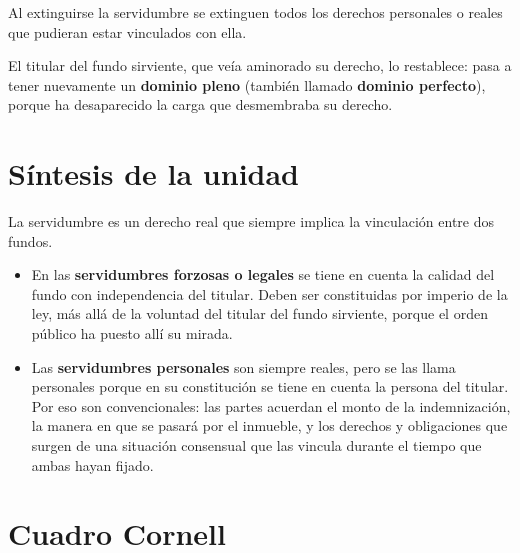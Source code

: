 \documentclass[12pt,oneside]{book}
\begin{document}
Al extinguirse la servidumbre se extinguen todos los derechos personales o reales que pudieran estar vinculados con ella.

El titular del fundo sirviente, que veía aminorado su derecho, lo restablece: pasa a tener nuevamente un \textbf{dominio pleno} (también llamado \textbf{dominio perfecto}), porque ha desaparecido la carga que desmembraba su derecho.

\section{Síntesis de la unidad}

La servidumbre es un derecho real que siempre implica la vinculación entre dos fundos.

\begin{itemize}
    \item En las \textbf{servidumbres forzosas o legales} se tiene en cuenta la calidad del fundo con independencia del titular. Deben ser constituidas por imperio de la ley, más allá de la voluntad del titular del fundo sirviente, porque el orden público ha puesto allí su mirada.
    \item Las \textbf{servidumbres personales} son siempre reales, pero se las llama personales porque en su constitución se tiene en cuenta la persona del titular. Por eso son convencionales: las partes acuerdan el monto de la indemnización, la manera en que se pasará por el inmueble, y los derechos y obligaciones que surgen de una situación consensual que las vincula durante el tiempo que ambas hayan fijado.
\end{itemize}

\section{Cuadro Cornell}
\end{document}
